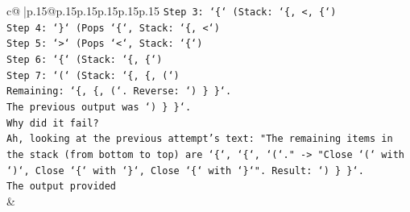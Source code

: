 \documentclass{article}
\begin{document}
{\begin{supertabular}{c@{$\;$}|p{.15\linewidth}@{}p{.15\linewidth}p{.15\linewidth}p{.15\linewidth}p{.15\linewidth}p{.15\linewidth}}
{{{\texttt{Step 3: `\{` (Stack: `\{, <, \{`)} \\
\texttt{Step 4: `\}` (Pops `\{`, Stack: `\{, <`)} \\
\texttt{Step 5: `>` (Pops `<`, Stack: `\{`)} \\
\texttt{Step 6: `\{` (Stack: `\{, \{`)} \\
\texttt{Step 7: `(` (Stack: `\{, \{, (`)} \\
\texttt{Remaining: `\{, \{, (`. Reverse: `) \} \}`.} \\
\texttt{The previous output was `) \} \}`.} \\
\texttt{Why did it fail?} \\
\texttt{Ah, looking at the previous attempt's text: "The remaining items in the stack (from bottom to top) are `\{`, `\{`, `(`." {-}> "Close `(` with `)`, Close `\{` with `\}`, Close `\{` with `\}`". Result: `) \} \}`.} \\
\texttt{The output provided} \\
            }
        }
    }
    & \\ \\

\end{supertabular}
}
\end{document}

